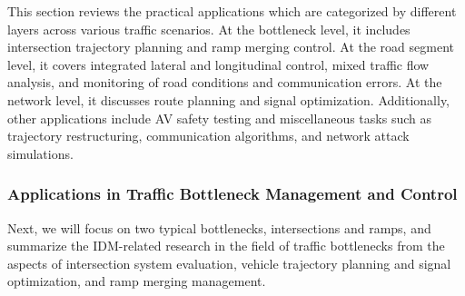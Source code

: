 \documentclass[a4paper,fleqn]{cas-sc}
\begin{document}
This section reviews the practical applications which are categorized by different layers across various traffic scenarios. At the bottleneck level, it includes intersection trajectory planning and ramp merging control. At the road segment level, it covers integrated lateral and longitudinal control, mixed traffic flow analysis, and monitoring of road conditions and communication errors. At the network level, it discusses route planning and signal optimization. Additionally, other applications include AV safety testing and miscellaneous tasks such as trajectory restructuring, communication algorithms, and network attack simulations. 

\subsubsection{Applications in Traffic Bottleneck Management and Control}

Next, we will focus on two typical bottlenecks, intersections and ramps, and summarize the IDM-related research in the field of traffic bottlenecks from the aspects of intersection system evaluation, vehicle trajectory planning and signal optimization, and ramp merging management.
\end{document}
